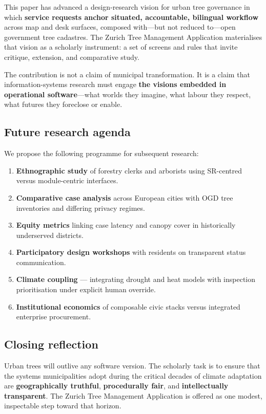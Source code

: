 \documentclass[12pt,a4paper]{article}
\newcommand{\appname}{Zurich Tree Management Application}
\begin{document}
This paper has advanced a design-research vision for urban tree governance in which \textbf{service requests anchor situated, accountable, bilingual workflow} across map and desk surfaces, composed with---but not reduced to---open government tree cadastres. The \appname{} materialises that vision as a scholarly instrument: a set of screens and rules that invite critique, extension, and comparative study.

The contribution is not a claim of municipal transformation. It is a claim that information-systems research must engage \textbf{the visions embedded in operational software}---what worlds they imagine, what labour they respect, what futures they foreclose or enable.

\subsection{Future research agenda}

We propose the following programme for subsequent research:

\begin{enumerate}
    \item \textbf{Ethnographic study} of forestry clerks and arborists using SR-centred versus module-centric interfaces.
    \item \textbf{Comparative case analysis} across European cities with OGD tree inventories and differing privacy regimes.
    \item \textbf{Equity metrics} linking case latency and canopy cover in historically underserved districts.
    \item \textbf{Participatory design workshops} with residents on transparent status communication.
    \item \textbf{Climate coupling} --- integrating drought and heat models with inspection prioritisation under explicit human override.
    \item \textbf{Institutional economics} of composable civic stacks versus integrated enterprise procurement.
\end{enumerate}

\subsection{Closing reflection}

Urban trees will outlive any software version. The scholarly task is to ensure that the systems municipalities adopt during the critical decades of climate adaptation are \textbf{geographically truthful}, \textbf{procedurally fair}, and \textbf{intellectually transparent}. The \appname{} is offered as one modest, inspectable step toward that horizon.
\end{document}
